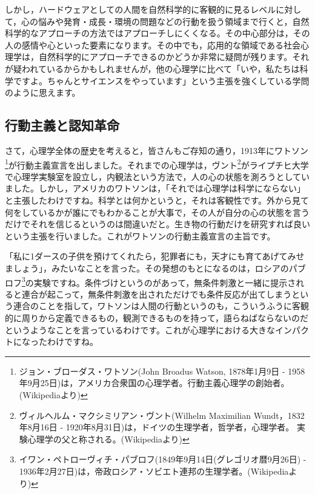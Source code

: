 \documentclass{ltjsbook}
\begin{document}
しかし，ハードウェアとしての人間を自然科学的に客観的に見るレベルに対して，心の悩みや発育・成長・環境の問題などの行動を扱う領域まで行くと，自然科学的なアプローチの方法ではアプローチしにくくなる。その中心部分は，その人の感情や心といった要素になります。その中でも，応用的な領域である社会心理学は，自然科学的にアプローチできるのかどうか非常に疑問が残ります。それが疑われているからかもしれませんが，他の心理学に比べて「いや，私たちは科学ですよ。ちゃんとサイエンスをやっています」という主張を強くしている学問のように思えます。

\subsection{行動主義と認知革命}
さて，心理学全体の歴史を考えると，皆さんもご存知の通り，1913年にワトソン\footnote{ジョン・ブローダス・ワトソン(John Broadus Watson, 1878年1月9日 - 1958年9月25日)は，アメリカ合衆国の心理学者。行動主義心理学の創始者。(Wikipediaより)}が行動主義宣言を出しました。それまでの心理学は，ヴント\footnote{ヴィルヘルム・マクシミリアン・ヴント(Wilhelm Maximilian Wundt，1832年8月16日 - 1920年8月31日)は，ドイツの生理学者，哲学者，心理学者。 実験心理学の父と称される。(Wikipediaより)}がライプチヒ大学で心理学実験室を設立し，内観法という方法で，人の心の状態を測ろうとしていました。しかし，アメリカのワトソンは，「それでは心理学は科学にならない」と主張したわけですね。科学とは何かというと，それは客観性です。外から見て何をしているかが誰にでもわかることが大事で，その人が自分の心の状態を言うだけでそれを信じるというのは間違いだと。生き物の行動だけを研究すれば良いという主張を行いました。これがワトソンの行動主義宣言の主旨です。

「私に1ダースの子供を預けてくれたら，犯罪者にも，天才にも育てあげてみせましょう」，みたいなことを言った。その発想のもとになるのは，ロシアのパブロフ\footnote{イワン・ペトローヴィチ・パブロフ(1849年9月14日(グレゴリオ暦9月26日) - 1936年2月27日)は，帝政ロシア・ソビエト連邦の生理学者。(Wikipediaより)}の実験ですね。条件づけというのがあって，無条件刺激と一緒に提示されると連合が起こって，無条件刺激を出されただけでも条件反応が出てしまうという連合のことを指して，ワトソンは人間の行動というのも，こういうふうに客観的に周りから定義できるもの，観測できるものを持って，語らねばならないのだというようなことを言っているわけです。これが心理学における大きなインパクトになったわけですね。
\end{document}
